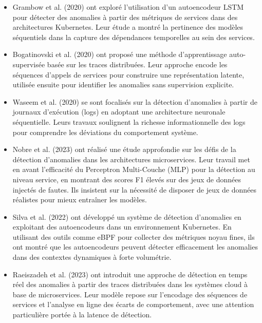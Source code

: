 \documentclass[a4paper,12pt]{report}
\begin{document}
\begin{itemize}
\item Grambow et al. (2020) ont exploré l’utilisation d’un autoencodeur LSTM pour détecter des anomalies à partir des métriques de services dans des architectures Kubernetes. Leur étude a montré la pertinence des modèles séquentiels dans la capture des dépendances temporelles au sein des services.

\item Bogatinovski et al. (2020) ont proposé une méthode d’apprentissage auto-supervisée basée sur les traces distribuées. Leur approche encode les séquences d’appels de services pour construire une représentation latente, utilisée ensuite pour identifier les anomalies sans supervision explicite.

\item Waseem et al. (2020) se sont focalisés sur la détection d’anomalies à partir de journaux d’exécution (logs) en adoptant une architecture neuronale séquentielle. Leurs travaux soulignent la richesse informationnelle des logs pour comprendre les déviations du comportement système.

\item Nobre et al. (2023) ont réalisé une étude approfondie sur les défis de la détection d’anomalies dans les architectures microservices. Leur travail met en avant l’efficacité du Perceptron Multi-Couche (MLP) pour la détection au niveau service, en montrant des scores F1 élevés sur des jeux de données injectés de fautes. Ils insistent sur la nécessité de disposer de jeux de données réalistes pour mieux entraîner les modèles.

\item Silva et al. (2022) ont développé un système de détection d’anomalies en exploitant des autoencodeurs dans un environnement Kubernetes. En utilisant des outils comme eBPF pour collecter des métriques noyau fines, ils ont montré que les autoencodeurs peuvent détecter efficacement les anomalies dans des contextes dynamiques à forte volumétrie.

\item Raeiszadeh et al. (2023) ont introduit une approche de détection en temps réel des anomalies à partir des traces distribuées dans les systèmes cloud à base de microservices. Leur modèle repose sur l’encodage des séquences de services et l’analyse en ligne des écarts de comportement, avec une attention particulière portée à la latence de détection.

\end{itemize}
\end{document}
